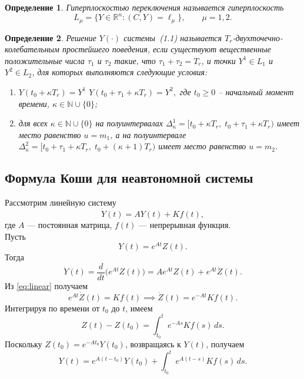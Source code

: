\documentclass[12pt,a4paper]{article}
\theoremstyle{bigplain}
\theoremstyle{plain}
\newtheorem{definition}{Определение}
\begin{document}
\begin{definition}
Гиперплоскостью переключения называется гиперплоскость
\[
L_\mu=\{Y\in\mathbb{R}^n:(C,Y)=\ell_\mu\},\qquad \mu=1,2.
\]
\end{definition}

\begin{definition}
Решение $Y(\cdot)$ системы~(1.1) называется
$T_r$-двухточечно-колебательным простейшего поведения,
если существуют вещественные положительные числа $\tau_1$ и $\tau_2$ такие, что
$\tau_1+\tau_2=T_r$, и точки $Y^{1}\in L_1$ и $Y^{2}\in L_2$,
для которых выполняются следующие условия:

\begin{enumerate}[label=\textbf{\arabic*)}, leftmargin=*]
\item
$Y(t_0+\kappa T_r)=Y^{1}$
\quad {} \quad
$Y(t_0+\tau_1+\kappa T_r)=Y^{2},$
где $t_0\ge 0$ -- начальный момент времени,
$\kappa\in\mathbb{N}\cup\{0\}$;

\item
для всех $\kappa\in\mathbb{N}\cup\{0\}$ на полуинтервалах
$\Delta_\kappa^{1}=[t_0+\kappa T_r,\; t_0+\tau_1+\kappa T_r)$
имеет место равенство $u=m_1$, а на полуинтервале
$\Delta_\kappa^{2}=[t_0+\tau_1+\kappa T_r,\; t_0+(\kappa+1)T_r)$
имеет место равенство $u=m_2$.
\end{enumerate}
\end{definition}   





\subsection*{Формула Коши для неавтономной системы}

Рассмотрим линейную систему
\begin{equation}
\dot Y(t)=AY(t)+Kf(t),
\tag{1.2}
\label{eq:linear}
\end{equation}
где $A$ — постоянная матрица, $f(t)$ — непрерывная функция.\\
Пусть
\[
Y(t)=e^{At}Z(t).
\]
Тогда
\[
\dot Y(t)=\frac{d}{dt}\bigl(e^{At}Z(t)\bigr)
= Ae^{At}Z(t)+e^{At}\dot Z(t).
\]
Из \eqref{eq:linear} получаем
\[
e^{At}\dot Z(t) = Kf(t) \implies \dot Z(t) = e^{-At}Kf(t).
\]
Интегрируя по времени от $t_0$ до $t$, имеем
\[
Z(t)-Z(t_0)=\int_{t_0}^{t} e^{-As}Kf(s)\,ds.
\]
Поскольку $Z(t_0)=e^{-At_0}Y(t_0)$, возвращаясь к $Y(t)$, получаем
\[
Y(t)
=
e^{A(t-t_0)}Y(t_0)
+
\int_{t_0}^{t} e^{A(t-s)}Kf(s)\,ds.
\]
\end{document}
